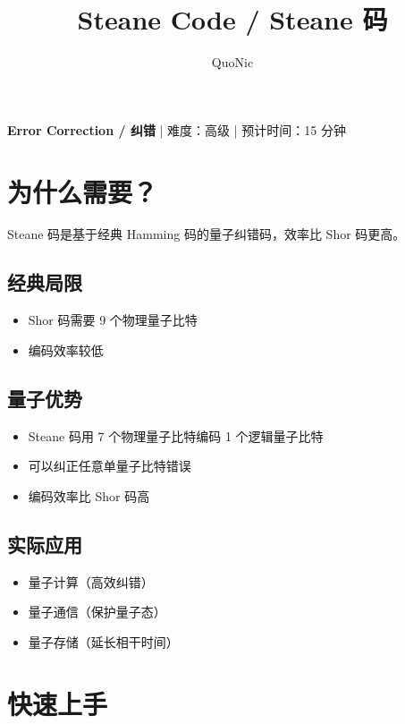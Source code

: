 \documentclass[12pt,a4paper]{article}
\title{Steane Code / Steane 码}
\author{QuoNic}
\date{}
\begin{document}
\maketitle

\begin{center}
\textbf{Error Correction / 纠错} | 难度：高级 | 预计时间：15 分钟
\end{center}

\tableofcontents
\newpage

\section{为什么需要？}

Steane 码是基于经典 Hamming 码的量子纠错码，效率比 Shor 码更高。

\subsection{经典局限}
\begin{itemize}
  \item Shor 码需要 9 个物理量子比特
  \item 编码效率较低
\end{itemize}

\subsection{量子优势}
\begin{itemize}
  \item Steane 码用 7 个物理量子比特编码 1 个逻辑量子比特
  \item 可以纠正任意单量子比特错误
  \item 编码效率比 Shor 码高
\end{itemize}

\subsection{实际应用}
\begin{itemize}
  \item 量子计算（高效纠错）
  \item 量子通信（保护量子态）
  \item 量子存储（延长相干时间）
\end{itemize}

\section{快速上手}
\end{document}
